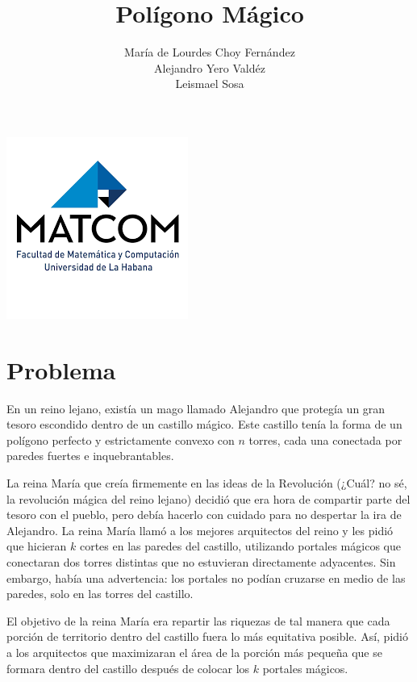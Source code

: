 \documentclass{article}
\title{\bf{Pol\'{i}gono M\'{a}gico}}
\date{}
\author{María de Lourdes Choy Fernández \\ Alejandro Yero Valdéz \\ Leismael Sosa}
\begin{document}
\pagestyle{empty}
\maketitle
\thispagestyle{empty}
\begin{center}
\includegraphics[scale=1]{images}
\end{center}
\newpage

\tableofcontents

\newpage
\setcounter{page}{1}
\pagestyle{plain}

\section{Problema}
En un reino lejano, existía un mago llamado Alejandro que protegía un gran tesoro escondido dentro de un castillo mágico. Este castillo tenía la forma de un polígono perfecto y estrictamente convexo con $n$ torres, cada una conectada por paredes fuertes e inquebrantables.

La reina María que creía firmemente en las ideas de la Revolución (¿Cuál? no sé, la revolución mágica del reino lejano) decidió que era hora de compartir parte del tesoro con el pueblo, pero debía hacerlo con cuidado para no despertar la ira de Alejandro. La reina María llamó a los mejores arquitectos del reino y les pidió que hicieran $k$ cortes en las paredes del castillo, utilizando portales mágicos que conectaran dos torres distintas que no estuvieran directamente adyacentes. Sin embargo, había una advertencia: los portales no podían cruzarse en medio de las paredes, solo en las torres del castillo.

El objetivo de la reina María era repartir las riquezas de tal manera que cada porción de territorio dentro del castillo fuera lo más equitativa posible. Así, pidió a los arquitectos que maximizaran el área de la porción más pequeña que se formara dentro del castillo después de colocar los $k$ portales mágicos.
\end{document}
